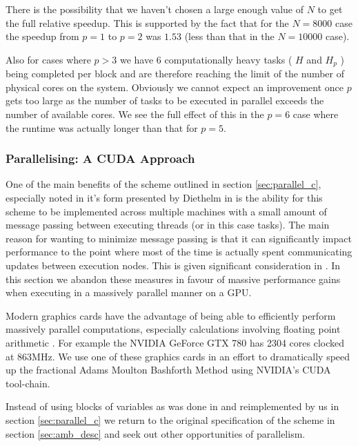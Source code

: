 There is the possibility that we haven't chosen a large enough value of $ N $ to get the full relative speedup. This is supported by the fact that for the $ N = 8000 $ case the speedup from $ p = 1 $ to $ p = 2 $ was $ 1.53 $ (less than that in the $ N = 10000 $ case). 

Also for cases where $ p > 3 $ we have 6 computationally heavy tasks ( $ H $ and $ H_p $ ) being completed per block and are therefore reaching the limit of the number of physical cores on the system. Obviously we cannot expect an improvement once $ p $ gets too large as the number of tasks to be executed in parallel exceeds the number of available cores. We see the full effect of this in the $ p = 6 $ case where the runtime was actually longer than that for $ p = 5 $.

\subsubsection{Parallelising: A CUDA Approach}

\label{sec:parallel_cuda}

One of the main benefits of the scheme outlined in section \ref{sec:parallel_c}, especially noted in it's form presented by Diethelm in \cite{Diethelm2011} is the ability for this scheme to be implemented across multiple machines with a small amount of message passing between executing threads (or in this case tasks). The main reason for wanting to minimize message passing is that it can significantly impact performance to the point where most of the time is actually spent communicating updates between execution nodes. This is given significant consideration in \cite{Diethelm2011}. In this section we abandon these measures in favour of massive performance gains when executing in a massively parallel manner on a GPU.

Modern graphics cards have the advantage of being able to efficiently perform massively parallel computations, especially calculations involving floating point arithmetic \cite{Fernando2005}. For example the NVIDIA GeForce GTX 780 has 2304 cores clocked at 863MHz. We use one of these graphics cards in an effort to dramatically speed up the fractional Adams Moulton Bashforth Method using NVIDIA's CUDA tool-chain.

Instead of using blocks of variables as was done in \cite{Diethelm2011} and reimplemented by us in section \ref{sec:parallel_c} we return to the original specification of the scheme in section \ref{sec:amb_desc} and seek out other opportunities of parallelism.


